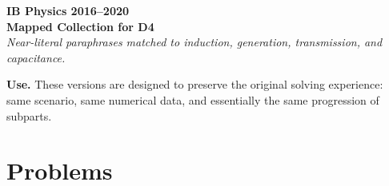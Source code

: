 \documentclass[11pt]{article}
\begin{document}
\begin{center}
{\LARGE \textbf{IB Physics 2016--2020}}\\
{\large \textbf{Mapped Collection for D4}}\\
\vspace{0.3em}
\textit{Near-literal paraphrases matched to induction, generation, transmission, and capacitance.}
\end{center}

\textbf{Use.} These versions are designed to preserve the original solving experience: same scenario, same numerical data, and essentially the same progression of subparts.

\section*{Problems}
\end{document}
